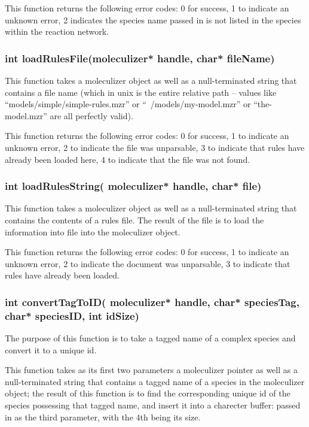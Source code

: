 This function returns the following error codes: 0 for success, 1 to
indicate an unknown error, 2 indicates the species name passed in is
not listed in the species within the reaction network.

\subsubsection{int loadRulesFile(moleculizer* handle, char* fileName)}
This function takes a moleculizer object as well as a null-terminated
string that contains a file name (which in unix is the entire relative
path -- values like ``models/simple/simple-rules.mzr'' or
``~/models/my-model.mzr'' or ``the-model.mzr'' are all perfectly
valid).

This function returns the following error codes: 0 for success, 1 to
indicate an unknown error, 2 to indicate the file was unparsable, 3 to
indicate that rules have already been loaded here, 4 to indicate that
the file was not found.

\subsubsection{int loadRulesString( moleculizer* handle, char* file)}
This function takes a moleculizer object as well as a null-terminated
string that contains the contents of a rules file.  The result of the
file is to load the information into file into the moleculizer object.

This function returns the following error codes: 0 for success, 1 to
indicate an unknown error, 2 to indicate the document was unparsable,
3 to indicate that rules have already been loaded.

\subsubsection{int convertTagToID( moleculizer* handle, char*
  speciesTag, char* speciesID, int idSize)}
The purpose of this function is to take a tagged name of a complex
species and convert it to a unique id.

This function takes as its first two parameters a moleculizer pointer
as well as a null-terminated string that contains a tagged name of a
species in the moleculizer object; the result of this function is to
find the corresponding unique id of the species possessing that tagged
name, and insert it into a charecter buffer: passed in as the third
parameter, with the 4th being its size.

